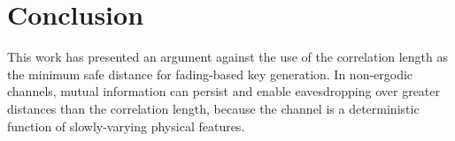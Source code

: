 \documentclass[conference]{ieeetran}
\begin{document}
\section{Conclusion}
This work has presented an argument against the use of the correlation length as the minimum safe distance for fading-based key generation.  In non-ergodic channels, mutual information can persist and enable eavesdropping over greater distances than the correlation length, because the channel is a deterministic function of slowly-varying physical features.  

{}
\end{document}
